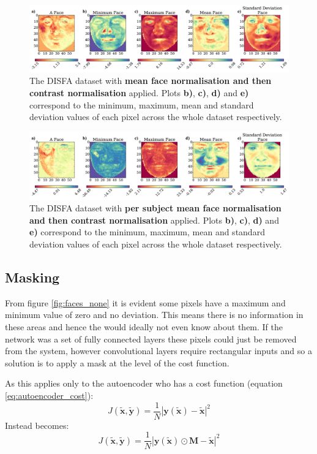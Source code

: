 \begin{figure}[!h] \centering
\includegraphics[width =\hsize]{figures/faces_contrast_face.pdf}
\caption{The DISFA dataset with {\bf mean face normalisation and then contrast normalisation} applied.
Plots {\bf b)}, {\bf c)}, {\bf d)} and {\bf e)} correspond to the minimum,
maximum, mean and standard deviation values of each pixel across the whole
dataset respectively.} \label{fig:faces_contrast_face} \end{figure}

\begin{figure}[!h] \centering
\includegraphics[width =\hsize]{figures/faces_per_subject_contrast_face.pdf}
\caption{The DISFA dataset with {\bf per subject mean face normalisation and then contrast normalisation} applied.
Plots {\bf b)}, {\bf c)}, {\bf d)} and {\bf e)} correspond to the minimum,
maximum, mean and standard deviation values of each pixel across the whole
dataset respectively.} \label{fig:faces_per_subject_contrast_face} \end{figure}

\subsection{Masking}
From figure \ref{fig:faces_none} it is evident some pixels have a maximum and minimum value
of zero and no deviation. This means there is no information in these areas and hence
the would ideally not even know about them. If the network was a set of fully connected layers
these pixels could just be removed from the system, however convolutional layers require
rectangular inputs and so a solution is to apply a mask at the level of the cost function.

As this applies only to the autoencoder who has a cost function (equation \ref{eq:autoencoder_cost}):
\begin{equation}
    J(\tilde{\mathbf{x}},\tilde{\mathbf{y}})
    = \frac{1}{N}\left |\mathbf{y}(\tilde{\mathbf{x}})-\tilde{\mathbf{x}}\right | ^2
\end{equation}
Instead becomes:
\begin{equation}
    J(\tilde{\mathbf{x}},\tilde{\mathbf{y}})
    = \frac{1}{N}\left |\mathbf{y}(\tilde{\mathbf{x}}) \odot \mathbf{M}-\tilde{\mathbf{x}}\right | ^2
\end{equation}

